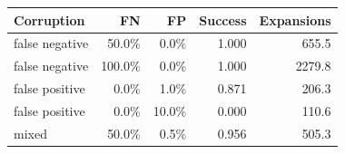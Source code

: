 \begin{tabular}{lrrrr}
\toprule
Corruption & FN & FP & Success & Expansions \\
\midrule
false negative & 50.0\% & 0.0\% & 1.000 & 655.5 \\
false negative & 100.0\% & 0.0\% & 1.000 & 2279.8 \\
false positive & 0.0\% & 1.0\% & 0.871 & 206.3 \\
false positive & 0.0\% & 10.0\% & 0.000 & 110.6 \\
mixed & 50.0\% & 0.5\% & 0.956 & 505.3 \\
\bottomrule
\end{tabular}
